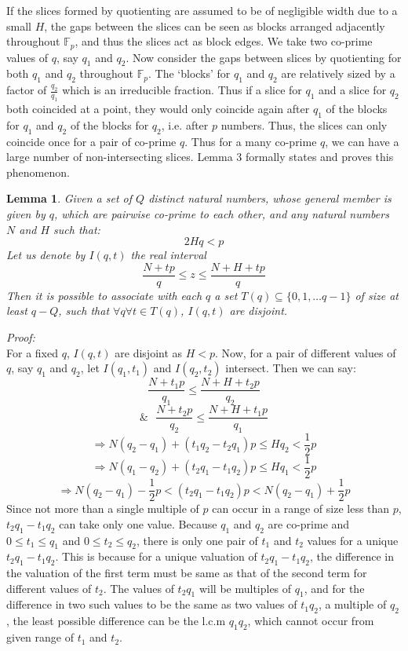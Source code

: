\documentclass{article}
\newtheorem{lemma}{Lemma}
\begin{document}
If the slices formed by quotienting are assumed to be of negligible width due to a small $H$, the gaps between the slices can be seen as blocks arranged adjacently throughout $\mathbb{F}_p$, and thus the slices act as block edges. We take two co-prime values of $q$, say $q_1$ and $q_2$. Now consider the gaps between slices by quotienting for both $q_1$ and $q_2$ throughout $\mathbb{F}_p$. The `blocks' for $q_1$ and $q_2$ are relatively sized by a factor of $\frac{q_2}{q_1}$ which is an irreducible fraction. Thus if a slice for $q_1$ and a slice for $q_2$ both coincided at a point, they would only coincide again after $q_1$ of the blocks for $q_1$ and $q_2$ of the blocks for $q_2$, i.e. after $p$ numbers. Thus, the slices can only coincide once for a pair of co-prime $q$. Thus for a many co-prime $q$, we can have a large number of non-intersecting slices. Lemma 3 formally states and proves this phenomenon.
%
\begin{lemma}
Given a set of $Q$ distinct natural numbers, whose general member is given by $q$, which are pairwise co-prime to each other, and any natural numbers $N$ and $H$ such that:
\begin{equation} \label{lemma3cond}
2Hq<p
\end{equation}
Let us denote by $I(q,t)$ the real interval
$$\frac{N+tp}{q} \leq z \leq \frac{N+H+tp}{q}$$
Then it is possible to associate with each $q$ a set $T(q)\subseteq \{0,1,\ldots q-1\}$ of size at least $q-Q$, such that $\forall q \forall t\in T(q)$, $I(q,t)$ are disjoint.
\end{lemma}
\textit{Proof:}\\
For a fixed $q$, $I(q,t)$ are disjoint as $H<p$. Now, for a pair of different values of $q$, say $q_1$ and $q_2$, let $I(q_1,t_1)$ and $I(q_2,t_2)$ intersect. Then we can say:
$$\frac{N+t_1p}{q_1} \leq \frac{N+H+t_2p}{q_2}$$
$$\&\text{ }\frac{N+t_2p}{q_2} \leq \frac{N+H+t_1p}{q_1}$$
$$\Rightarrow N(q_2-q_1)+(t_1q_2-t_2q_1)p\leq Hq_2<\frac{1}{2}p$$
$$\Rightarrow N(q_1-q_2)+(t_2q_1-t_1q_2)p\leq Hq_1<\frac{1}{2}p$$
$$\Rightarrow N(q_2-q_1)-\frac{1}{2}p < (t_2q_1-t_1q_2)p <N(q_2-q_1)+\frac{1}{2}p$$
Since not more than a single multiple of $p$ can occur in a range of size less than $p$, $t_2q_1-t_1q_2$ can take only one value. Because $q_1$ and $q_2$ are co-prime and $0\leq t_1 \leq q_1$ and $0\leq t_2 \leq q_2$, there is only one pair of $t_1$ and $t_2$ values for a unique $t_2q_1-t_1q_2$. This is because for a unique valuation of $t_2q_1-t_1q_2$, the difference in the valuation of the first term must be same as that of the second term for different values of $t_2$. The values of $t_2q_1$ will be multiples of $q_1$, and for the difference in two such values to be the same as two values of $t_1q_2$, a multiple of $q_2$, the least possible difference can be the l.c.m $q_1q_2$, which cannot occur from given range of $t_1$ and $t_2$.
\end{document}
